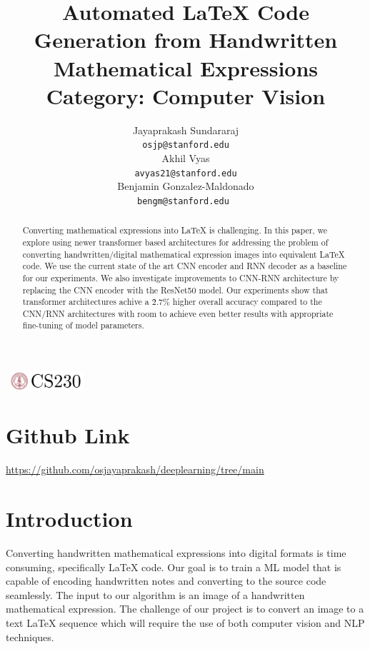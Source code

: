 \documentclass{article}
\title{Automated LaTeX Code Generation from Handwritten Mathematical Expressions \\
Category: Computer Vision}
\author{
  Jayaprakash Sundararaj \\
  \texttt{osjp@stanford.edu}  \\
  \AND
  Akhil Vyas \\
  \texttt{avyas21@stanford.edu}  \\
  \AND
  Benjamin Gonzalez-Maldonado \\
  \texttt{bengm@stanford.edu } \\
}
\begin{document}

\begin{center}
\includegraphics[width=3cm, height=0.7cm]{CS230}
\end{center}

\maketitle

\begin{abstract}
Converting mathematical expressions into LaTeX is challenging. In this paper, we explore using newer transformer based architectures for addressing the problem of converting handwritten/digital mathematical expression images into equivalent LaTeX code. We use the current state of the art CNN encoder and RNN decoder as a baseline for our experiments. We also investigate improvements to CNN-RNN architecture by replacing the CNN encoder with the ResNet50 model. Our experiments show that transformer architectures achive a \~2.7\% higher overall accuracy compared to the CNN/RNN architectures with room to achieve even better results with appropriate fine-tuning of model parameters.
\end{abstract}

\section{Github Link}

\url{https://github.com/osjayaprakash/deeplearning/tree/main}

\section{Introduction}	

Converting handwritten mathematical expressions into digital formats is time consuming, specifically LaTeX code. Our goal is to train a ML model that is capable of encoding handwritten notes and converting to the source code seamlessly. The input to our algorithm is an image of a handwritten mathematical expression. The challenge of our project is to convert an image to a text LaTeX sequence which will require the use of both computer vision and NLP techniques. 

\end{document}
